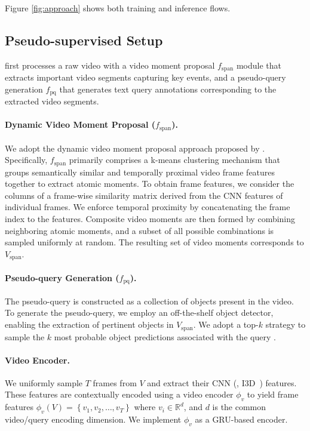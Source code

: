 \noindent Figure \ref{fig:approach} shows both training and inference flows.
\subsection{Pseudo-supervised Setup}
\modelname first processes a raw video with a video moment proposal $f_{\text{span}}$ module that extracts important video segments capturing key events, and a pseudo-query generation $f_{\text{pq}}$ that generates text query annotations corresponding to the extracted video segments.

\paragraph{Dynamic Video Moment Proposal ($f_{\text{span}}$).}
We adopt the dynamic video moment proposal approach proposed by \citet{nam_zero-shot_2021}. Specifically, $f_{\text{span}}$ primarily comprises a k-means clustering mechanism that groups semantically similar and temporally proximal video frame features together to extract atomic moments. To obtain frame features, we consider the columns of a frame-wise similarity matrix derived from the CNN features of individual frames. We enforce temporal proximity by concatenating the frame index to the features. Composite video moments are then formed by combining neighboring atomic moments, and a subset of all possible combinations is sampled uniformly at random. The resulting set of video moments corresponds to $V_{\text{span}}$.

\paragraph{Pseudo-query Generation ($f_{\text{pq}}$).} The pseudo-query is constructed as a collection of objects present in the video. To generate the pseudo-query, we employ an off-the-shelf object detector, enabling the extraction of pertinent objects in \(V_{\text{span}}\). We adopt a top-$k$ strategy to sample the $k$ most probable object predictions associated with the query \query.

\paragraph{Video Encoder.}
We uniformly sample $T$ frames from $V$ and extract their CNN (\eg, I3D~\cite{qian_locate_2022}) features. These features are contextually encoded using a video encoder ${\phi}_{v}$ to yield frame features ${\phi}_{v}(V)\!=\!\left\{ v_{1},v_{2},\ldots,v_{T}\right\}$ where $v_{i}\in\mathbb{R}^{d}$, and $d$ is the common video/query encoding dimension. We implement ${\phi}_{v}$ as a GRU-based encoder.

